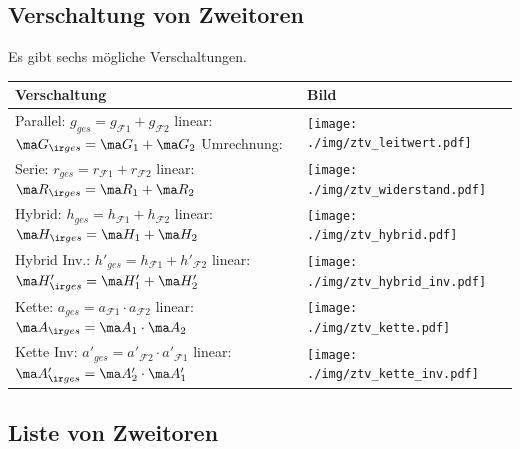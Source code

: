 \documentclass[fs, footer]{latex4ei}
\begin{document}
\begin{multicols*}{4}
    \subsection{Verschaltung von Zweitoren}
    Es gibt sechs mögliche Verschaltungen.\\
    \begin{tabular}{@{}ll}
        Verschaltung & Bild                                                        \\ \hline
        \parbox{3cm}{Parallel: $g_{ges}=g_{\mathcal F1}+g_{\mathcal F2}$           \\ linear: $\ma G_{\ir ges} = \ma G_1 + \ma G_2$ \\ Umrechnung: } & \parbox{2.5cm}{\texttt{[image: ./img/ztv\_leitwert.pdf]}}\\[2em]
        \parbox{3cm}{Serie: $r_{ges}=r_{\mathcal F1}+r_{\mathcal F2}$              \\ linear: $\ma R_{\ir ges} = \ma R_1 + \ma R_2$} & \parbox{2.5cm}{\texttt{[image: ./img/ztv\_widerstand.pdf]}}\\[2em]
        \parbox{3cm}{Hybrid: $h_{ges}=h_{\mathcal F1}+h_{\mathcal F2}$             \\ linear: $\ma H_{\ir ges} = \ma H_1 + \ma H_2$} & \parbox{2.5cm}{\texttt{[image: ./img/ztv\_hybrid.pdf]}}\\[2em]
        \parbox{3.5cm}{Hybrid Inv.: $h'_{ges}=h_{\mathcal F1}+h'_{\mathcal F2}$    \\ linear: $\ma H'_{\ir ges} = \ma H'_1 + \ma H'_2$} & \parbox{2.5cm}{\texttt{[image: ./img/ztv\_hybrid\_inv.pdf]}}\\[2em]
        \parbox{3cm}{Kette: $a_{ges}=a_{\mathcal F1} \cdot a_{\mathcal F2}$        \\ linear: $\ma A_{\ir ges} = \ma A_1 \cdot \ma A_2$} & \parbox{2.5cm}{\texttt{[image: ./img/ztv\_kette.pdf]}}\\[2em]
        \parbox{3cm}{Kette Inv: $a'_{ges}=a'_{\mathcal F2} \cdot a'_{\mathcal F1}$ \\ linear: $\ma A'_{\ir ges} = \ma A'_2 \cdot \ma A'_1$} & \parbox{2.5cm}{\texttt{[image: ./img/ztv\_kette\_inv.pdf]}}\\
    \end{tabular}

    \subsection{Liste von Zweitoren}

\end{multicols*}
\end{document}
